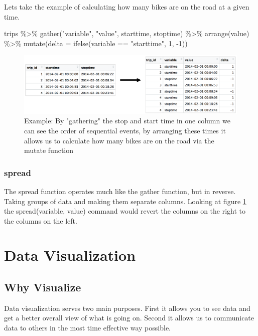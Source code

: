 \begin{flushleft}
Lets take the example of calculating how many bikes are on the road at a given time.
\end{flushleft}

\begin{center}
trips \%\textgreater\% gather("variable", "value", starttime, stoptime) \%\textgreater\% arrange(value) \%\textgreater\% mutate(delta = ifelse(variable == "starttime", 1, -1))
\end{center}    

\begin{figure}[h]
    \centering
    \includegraphics[width=.75\textwidth]{figures/gather_ex.png}
    \caption{Example: By "gathering" the stop and start time in one column we can see the order of sequential events, by arranging these times it allows us to calculate how many bikes are on the road via the mutate function}
    \label{fig:gather_ex}
\end{figure}


\subsubsection{spread}
\begin{flushleft}
The spread function operates much like the gather function, but in reverse. Taking groups of data and making them separate columns. Looking at figure \ref{fig:gather_ex} the spread(variable, value) command would revert the columns on the right to the columns on the left.
\end{flushleft}


\section{Data Visualization}
\subsection{Why Visualize}

\begin{flushleft}
Data visualization serves two main purposes. First it allows you to see data and get a better overall view of what is going on. Second it allows us to communicate data to others in the most time effective way possible. 
\end{flushleft}

